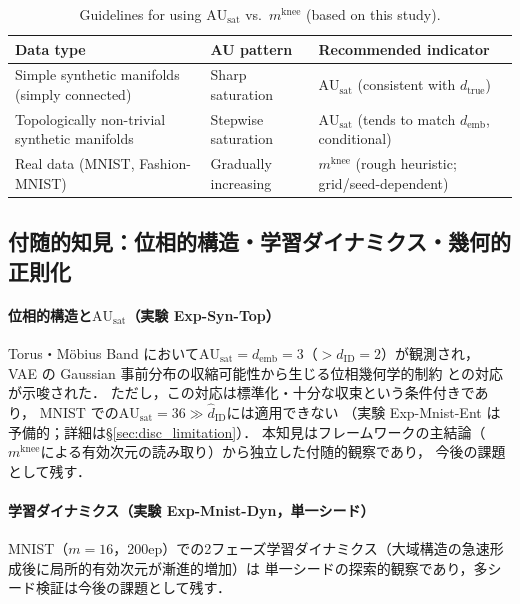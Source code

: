 \documentclass[11pt,a4paper]{jsarticle}
\newcommand{\dID}{d_{\mathrm{ID}}}
\newcommand{\dtrue}{d_{\mathrm{true}}}
\newcommand{\AUsat}{\mathrm{AU}_{\mathrm{sat}}}
\newcommand{\mknee}{m^{\mathrm{knee}}}
\newcommand{\demb}{d_{\mathrm{emb}}}
\begin{document}
\begin{table}[H]
\centering
\caption{Guidelines for using $\AUsat$ vs.\ $\mknee$ (based on this study).}
\label{tab:au_comparison}
\small
\begin{tabular}{p{4.6cm}p{2.9cm}p{5.6cm}}
\toprule
Data type & AU pattern & Recommended indicator \\
\midrule
Simple synthetic manifolds (simply connected) & Sharp saturation & $\AUsat$ (consistent with $\dtrue$) \\
Topologically non-trivial synthetic manifolds & Stepwise saturation & $\AUsat$ (tends to match $\demb$, conditional) \\
Real data (MNIST, Fashion-MNIST) & Gradually increasing & $\mknee$ (rough heuristic; grid/seed-dependent) \\
\bottomrule
\end{tabular}
\end{table}

\subsection{付随的知見：位相的構造・学習ダイナミクス・幾何的正則化}\label{sec:disc_incidental}

\paragraph{位相的構造と$\AUsat$（実験 Exp-Syn-Top）}
Torus・Möbius Band において$\AUsat = \demb = 3$（$> \dID = 2$）が観測され，
VAE の Gaussian 事前分布の収縮可能性から生じる位相幾何学的制約
\cite{hatcher2002algebraic,guillemin1974differential}との対応が示唆された．
ただし，この対応は標準化・十分な収束という条件付きであり，
MNIST での$\AUsat = 36 \gg \hat{d}_\mathrm{ID}$には適用できない
（実験 Exp-Mnist-Ent は予備的；詳細は§\ref{sec:disc_limitation}）．
本知見はフレームワークの主結論（$\mknee$による有効次元の読み取り）から独立した付随的観察であり，
今後の課題として残す．

\paragraph{学習ダイナミクス（実験 Exp-Mnist-Dyn，単一シード）}
MNIST（$m=16$，200ep）での2フェーズ学習ダイナミクス（大域構造の急速形成後に局所的有効次元が漸進的増加）は
単一シードの探索的観察であり，多シード検証は今後の課題として残す．
\end{document}
